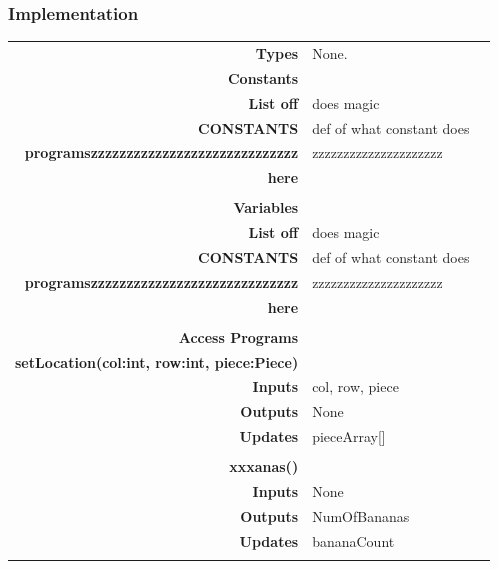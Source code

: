 \documentclass[10pt]{article}
\begin{document}
    \subsubsection{Implementation}
        \begin{tabularx}{\linewidth}{ >{\bfseries}r Xp{5cm} }
            Types           & None. \\
            
            Constants       & \begin{tabular}[t]{@{} l p{8cm}} 
                                 & \\
                                List off & does magic \\
                                CONSTANTS & def of what constant does \\
                                programszzzzzzzzzzzzzzzzzzzzzzzzzzzzz & zzzzzzzzzzzzzzzzzzzzz \\
                                here & \\ 
                            \end{tabular} \\
                              
            Variables       & \begin{tabular}[t]{@{} l p{8cm}} 
                                     & \\
                                    List off & does magic \\
                                    CONSTANTS & def of what constant does \\
                                    programszzzzzzzzzzzzzzzzzzzzzzzzzzzzz & zzzzzzzzzzzzzzzzzzzzz \\
                                    here & \\ 
                              \end{tabular} \\

            Access Programs & \begin{tabular}[t]{@{} l l p{8cm}} 
                                     & \\
                                    \bf{setLocation(col:int, row:int, piece:Piece)} & \\
                                    Inputs &  col, row, piece\\
                                    Outputs & None \\
                                    Updates & pieceArray[] \\ 
                                     & \\
                                    \bf{xxxanas()} & \\
                                    Inputs & None \\
                                    Outputs & NumOfBananas \\
                                    Updates & bananaCount \\ 
                              \end{tabular} \\
                              
        \end{tabularx}
        
\end{document}
